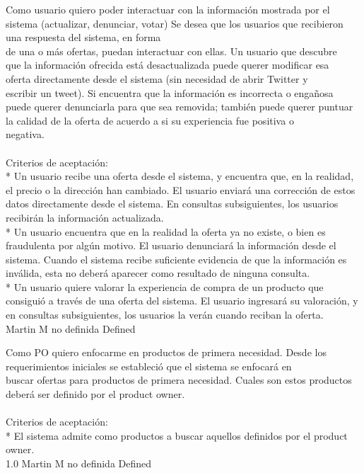 	{Como usuario quiero poder interactuar con la información mostrada por el sistema (actualizar, denunciar, votar)} %
	{Se desea que los usuarios que recibieron una respuesta del sistema, en forma\\
de una o más ofertas, puedan interactuar con ellas. Un usuario que descubre\\
que la información ofrecida está desactualizada puede querer modificar esa\\
oferta directamente desde el sistema (sin necesidad de abrir Twitter y\\
escribir un tweet). Si encuentra que la información es incorrecta o engañosa\\
puede querer denunciarla para que sea removida; también puede querer puntuar\\
la calidad de la oferta de acuerdo a si su experiencia fue positiva o\\
negativa.\\
  \\
Criterios de aceptación:\\
* Un usuario recibe una oferta desde el sistema, y encuentra que, en la realidad, el precio o la dirección han cambiado. El usuario enviará una corrección de estos datos directamente desde el sistema. En consultas subsiguientes, los usuarios recibirán la información actualizada.  \\
* Un usuario encuentra que en la realidad la oferta ya no existe, o bien es fraudulenta por algún motivo. El usuario denunciará la información desde el sistema. Cuando el sistema recibe suficiente evidencia de que la información es inválida, esta no deberá aparecer como resultado de ninguna consulta.  \\
* Un usuario quiere valorar la experiencia de compra de un producto que consiguió a través de una oferta del sistema. El usuario ingresará su valoración, y en consultas subsiguientes, los usuarios la verán cuando reciban la oferta.\\
} %
	{} %
	{} %
	{Martin M} %
	{no definida} %
	{Defined} %


\vspace{20pt}

	{Como PO quiero enfocarme en productos de primera necesidad.} %
	{Desde los requerimientos iniciales se estableció que el sistema se enfocará en\\
buscar ofertas para productos de primera necesidad. Cuales son estos productos\\
deberá ser definido por el product owner.\\
  \\
Criterios de aceptación:\\
* El sistema admite como productos a buscar aquellos definidos por el product owner.\\
} %
	{} %
	{1.0} %
	{Martin M} %
	{no definida} %
	{Defined} %

